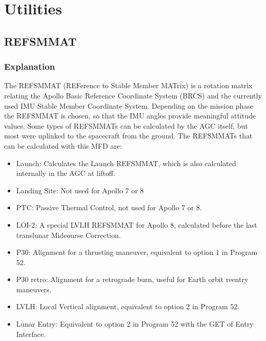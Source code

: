 \documentclass[11pt]{article} %
\begin{document}
\section{Utilities}
\subsection{REFSMMAT}
\subsubsection{Explanation}

The REFSMMAT (REFerence to Stable Member MATrix) is a rotation matrix relating the Apollo Basic Reference Coordinate System (BRCS) and the currently used IMU Stable Member Coordinate System. Depending on the mission phase the REFSMMAT is chosen, so that the IMU angles provide meaningful attitude values. Some types of REFSMMATs can be calculated by the AGC itself, but most were uplinked to the spacecraft from the ground. The REFSMMATs that can be calculated with this MFD are:

\begin{itemize}
	\item{Launch: Calculates the Launch REFSMMAT, which is also calculated internally in the AGC at liftoff.}
	\item{Landing Site: Not used for Apollo 7 or 8}
	\item{PTC: Passive Thermal Control, not used for Apollo 7 or 8.}
	\item{LOI-2: A special LVLH REFSMMAT for Apollo 8, calculated before the last translunar Midcourse Correction.}
	\item{P30: Alignment for a thrusting maneuver, equivalent to option 1 in Program 52.}
	\item{P30 retro: Alignment for a retrograde burn, useful for Earth orbit reentry maneuvers.}
	\item{LVLH: Local Vertical alignment, equivalent to option 2 in Program 52.}
	\item{Lunar Entry: Equivalent to option 2 in Program 52 with the GET of Entry Interface.}
\end{itemize}
	
\end{document}
